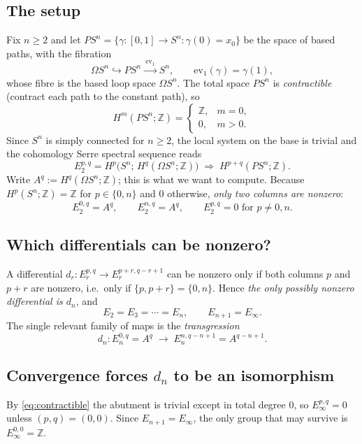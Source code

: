 \documentclass{article}
\newcommand{\Z}{{\mathbb{Z}}}
\begin{document}
\subsection{The setup}

Fix $n\ge 2$ and let $PS^n=\{\gamma\colon[0,1]\to S^n : \gamma(0)=x_0\}$ be the
space of based paths, with the fibration
\[
  \Omega S^n \hookrightarrow PS^n \xrightarrow{\ \mathrm{ev}_1\ } S^n,
  \qquad \mathrm{ev}_1(\gamma)=\gamma(1),
\]
whose fibre is the based loop space $\Omega S^n$. The total space $PS^n$ is
\emph{contractible} (contract each path to the constant path), so
\begin{equation}\label{eq:contractible}
  H^m(PS^n;\Z)=\begin{cases}\Z,& m=0,\\ 0,&m>0.\end{cases}
\end{equation}
Since $S^n$ is simply connected for $n\ge 2$, the local system on the base is
trivial and the cohomology Serre spectral sequence reads
\[
  E_2^{p,q}=H^p\!\big(S^n;\,H^q(\Omega S^n;\Z)\big)
  \;\Longrightarrow\; H^{p+q}(PS^n;\Z).
\]
Write $A^q:=H^q(\Omega S^n;\Z)$; this is what we want to compute. Because
$H^p(S^n;\Z)=\Z$ for $p\in\{0,n\}$ and $0$ otherwise, \emph{only two columns are
nonzero}:
\[
  E_2^{0,q}=A^q,\qquad E_2^{n,q}=A^q,\qquad E_2^{p,q}=0 \text{ for } p\neq 0,n.
\]

\subsection{Which differentials can be nonzero?}

A differential $d_r\colon E_r^{p,q}\to E_r^{p+r,q-r+1}$ can be nonzero only if
both columns $p$ and $p+r$ are nonzero, i.e.\ only if $\{p,p+r\}=\{0,n\}$. Hence
\emph{the only possibly nonzero differential is $d_n$}, and
\[
  E_2=E_3=\cdots=E_n,\qquad E_{n+1}=E_\infty .
\]
The single relevant family of maps is the \emph{transgression}
\[
  d_n\colon E_n^{0,q}=A^{q}\;\to\;E_n^{n,q-n+1}=A^{q-n+1}.
\]

\subsection{Convergence forces $d_n$ to be an isomorphism}

By \eqref{eq:contractible} the abutment is trivial except in total degree $0$, so
$E_\infty^{p,q}=0$ unless $(p,q)=(0,0)$. Since $E_{n+1}=E_\infty$, the only
group that may survive is $E_\infty^{0,0}=\Z$.
\end{document}
